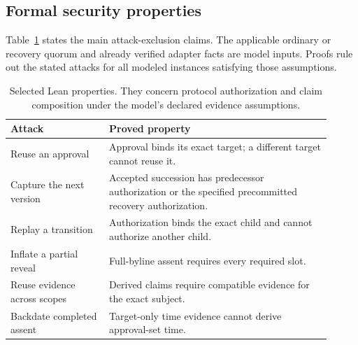 \documentclass[acmsmall,screen,review,nonacm]{acmart}
\begin{document}
\subsection{Formal security properties}
\label{sec:formal}

Table~\ref{tab:formal-properties} states the main attack-exclusion claims.
The applicable ordinary or recovery quorum and already verified adapter facts
are model inputs. Proofs rule out the stated attacks for all modeled instances
satisfying those assumptions.

\begin{table}[t]
\centering\small
\begin{tabular}{p{0.28\linewidth}p{0.63\linewidth}}
\toprule
Attack & Proved property \\
\midrule
Reuse an approval & Approval binds its exact target; a different target cannot reuse it. \\
Capture the next version & Accepted succession has predecessor authorization or the specified precommitted recovery authorization. \\
Replay a transition & Authorization binds the exact child and cannot authorize another child. \\
Inflate a partial reveal & Full-byline assent requires every required slot. \\
Reuse evidence across scopes & Derived claims require compatible evidence for the exact subject. \\
Backdate completed assent & Target-only time evidence cannot derive approval-set time. \\
\bottomrule
\end{tabular}
\caption{Selected Lean properties. They concern protocol authorization and
claim composition under the model's declared evidence assumptions.}
\label{tab:formal-properties}
\end{table}
\end{document}
